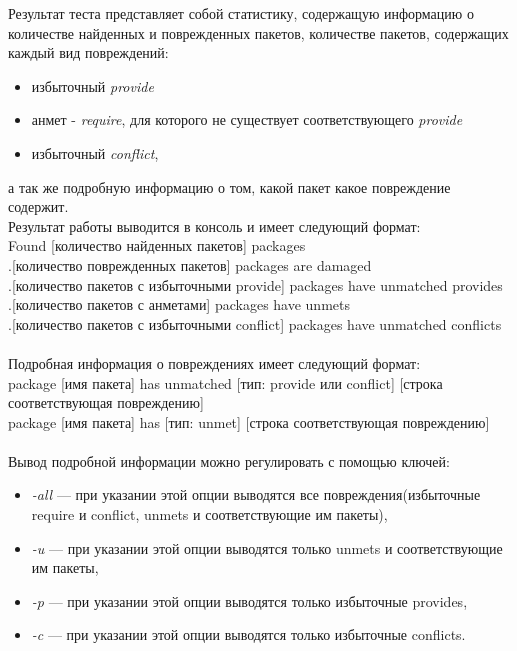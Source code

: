 Результат теста представляет собой статистику, содержащую информацию 
о количестве найденных и поврежденных пакетов, количестве пакетов, содержащих
каждый вид повреждений:\\
\begin{itemize}
\item{избыточный \textit{provide}}
\item{анмет - \textit{require}, для которого не существует соответствующего \textit{provide}}
\item{избыточный \textit{conflict}},
\end{itemize}
а так же подробную информацию о том, какой пакет какое повреждение содержит.\\
Результат работы выводится в консоль и имеет следующий формат:\\
Found [количество найденных пакетов] packages\\
.[количество поврежденных пакетов] packages are damaged\\
.[количество пакетов с избыточными provide] packages have unmatched provides\\
.[количество пакетов с анметами] packages have unmets\\
.[количество пакетов с избыточными conflict] packages have unmatched conflicts\\
\\
Подробная информация о повреждениях имеет следующий формат:\\
package [имя пакета] has unmatched [тип: provide или conflict] [строка соответствующая повреждению]\\
package [имя пакета] has [тип: unmet] [строка соответствующая повреждению]\\
\\
Вывод подробной информации можно регулировать с помощью ключей:\\
\begin{itemize}
\item{\emph{-all} --- при указании этой опции выводятся все повреждения(избыточные require и conflict, unmets и
соответствующие им пакеты),}
\item{\emph{-u} --- при указании этой опции выводятся только unmets и соответствующие им пакеты,}
\item{\emph{-p} --- при указании этой опции выводятся только  избыточные provides,}
\item{\emph{-c} --- при указании этой опции выводятся только избыточные conflicts.}
\end{itemize}

